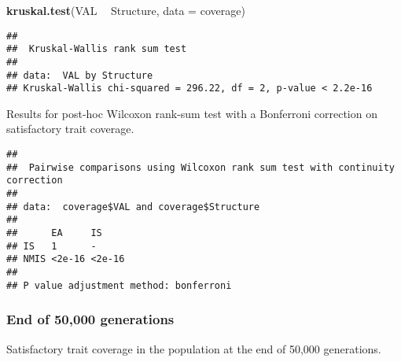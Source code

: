 \documentclass[]{book}
\newenvironment{Shaded}{\begin{snugshade}}{\end{snugshade}}
\newcommand{\DataTypeTok}[1]{\textcolor[rgb]{0.13,0.29,0.53}{#1}}
\newcommand{\KeywordTok}[1]{\textcolor[rgb]{0.13,0.29,0.53}{\textbf{#1}}}
\newcommand{\NormalTok}[1]{#1}
\newcommand{\OperatorTok}[1]{\textcolor[rgb]{0.81,0.36,0.00}{\textbf{#1}}}
\newcommand{\OtherTok}[1]{\textcolor[rgb]{0.56,0.35,0.01}{#1}}
\newcommand{\StringTok}[1]{\textcolor[rgb]{0.31,0.60,0.02}{#1}}
\begin{document}
\begin{Shaded}
\begin{Highlighting}[]
\KeywordTok{kruskal.test}\NormalTok{(VAL }\OperatorTok{~}\StringTok{ }\NormalTok{Structure, }\DataTypeTok{data =}\NormalTok{ coverage)}
\end{Highlighting}
\end{Shaded}

\begin{verbatim}
## 
##  Kruskal-Wallis rank sum test
## 
## data:  VAL by Structure
## Kruskal-Wallis chi-squared = 296.22, df = 2, p-value < 2.2e-16
\end{verbatim}

Results for post-hoc Wilcoxon rank-sum test with a Bonferroni correction on satisfactory trait coverage.

\begin{Shaded}
\end{Shaded}

\begin{verbatim}
## 
##  Pairwise comparisons using Wilcoxon rank sum test with continuity correction 
## 
## data:  coverage$VAL and coverage$Structure 
## 
##      EA     IS    
## IS   1      -     
## NMIS <2e-16 <2e-16
## 
## P value adjustment method: bonferroni
\end{verbatim}

\hypertarget{end-of-50000-generations-9}{%
\subsubsection{End of 50,000 generations}\label{end-of-50000-generations-9}}

Satisfactory trait coverage in the population at the end of 50,000 generations.
\end{document}
